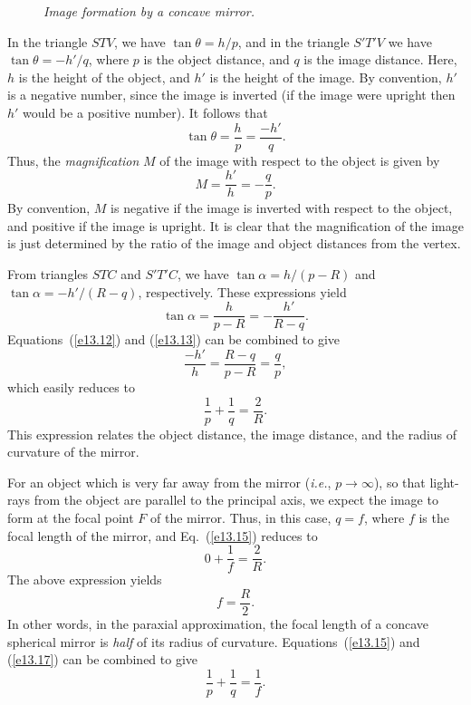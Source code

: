 \begin{figure}
\epsfysize=3in
\centerline{}
\caption{\em Image formation by a concave mirror.}\label{f13.6}
\end{figure}

In the triangle $STV$, we have $\tan\theta=h/p$, and in the
triangle $S'T'V$ we have $\tan\theta=-h'/q$, where $p$ is
the object distance, and $q$ is the image distance. Here,
$h$ is the height of the object, and $h'$ is the height of
the image. By convention, $h'$ is a negative number, since
the image is inverted (if the image were upright then $h'$
would be a positive number). It follows that
\begin{equation}
\tan\theta = \frac{h}{p}= \frac{-h'}{q}.
\end{equation}
Thus, the {\em magnification} $M$ of the image with respect
to the object is given by
\begin{equation}\label{e13.12}
M = \frac{h'}{h} = -\frac{q}{p}.
\end{equation}
By convention, $M$ is negative if the image is inverted with
respect to the object,  and
positive if the image is upright. It is clear that the
magnification of the image is just determined by the
ratio of the image and object distances from the vertex. 

From triangles $STC$ and $S'T'C$, we have $\tan\alpha
=h/(p-R)$ and $\tan \alpha = -h'/(R-q)$, respectively.
These expressions yield
\begin{equation}\label{e13.13}
\tan\alpha = \frac{h}{p-R} = - \frac{h'}{R-q}.
\end{equation}
Equations~(\ref{e13.12}) and (\ref{e13.13}) can be combined to give
\begin{equation}
\frac{-h'}{h} = \frac{R-q}{p-R} = \frac{q}{p},
\end{equation}
which easily reduces to
\begin{equation}\label{e13.15}
\frac{1}{p}+\frac{1}{q} = \frac{2}{R}.
\end{equation}
This expression relates the object distance, the image distance,
and the radius of curvature of the mirror. 

For an object which is very far away from
the mirror ({\em i.e.}, $p\rightarrow\infty$),
so that light-rays from the object are parallel to the principal
axis, we expect the image to form at the focal point
$F$ of the mirror. Thus, in this case, $q=f$, where $f$ is
the focal length of the mirror, and Eq.~(\ref{e13.15}) reduces to
\begin{equation}
0 + \frac{1}{f} = \frac{2}{R}.
\end{equation}
The above expression yields
\begin{equation}\label{e13.17}
f = \frac{R}{2}.
\end{equation}
In other words,  in the paraxial approximation, the focal length
of a concave spherical mirror is {\em half}\/ of its radius of
curvature.
 Equations~(\ref{e13.15}) and (\ref{e13.17}) can be combined to give
\begin{equation}\label{e13.18}
\frac{1}{p} + \frac{1}{q} = \frac{1}{f}.
\end{equation}

